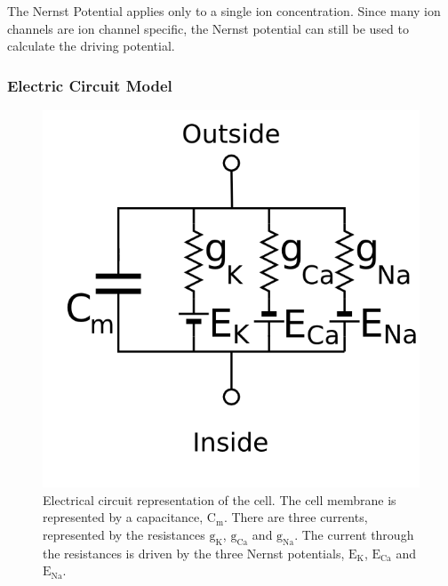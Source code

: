The Nernst Potential applies only to a single ion concentration.
Since many ion channels are ion channel specific, the Nernst potential can still
be used to calculate the driving potential.

\subsubsection{Electric Circuit Model}

\begin{figure}
\begin{center}
\includegraphics{figures/intro/electrical_circuit_cell}
\end{center}
\caption[Electrical Circuit Model Of The Cell]{
\label{fig:intro:math:circuit}
Electrical circuit representation of the cell.
The cell membrane is represented by a capacitance, $\text{C}_{\text{m}}$.
There are three currents, represented by the resistances $\text{g}_{\text{K}}$, 
$\text{g}_{\text{Ca}}$ and $\text{g}_{\text{Na}}$.
The current through the resistances is driven by the three Nernst potentials,
$\text{E}_{\text{K}}$, 
$\text{E}_{\text{Ca}}$ and $\text{E}_{\text{Na}}$.
}
\end{figure}

